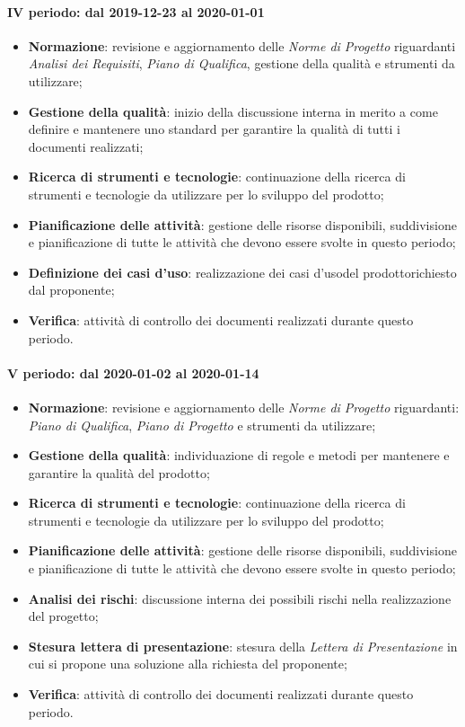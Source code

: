 \paragraph*{IV periodo: dal 2019-12-23 al 2020-01-01}
\begin{itemize}
	\item \textbf{Normazione}: revisione e aggiornamento delle \textit{Norme di Progetto} riguardanti \textit{Analisi dei Requisiti}, \textit{Piano di Qualifica}, gestione della qualità e strumenti da utilizzare;
	\item \textbf{Gestione della qualità}: inizio della discussione interna in merito a come definire e mantenere uno standard per garantire la qualità di tutti i documenti realizzati;
	\item \textbf{Ricerca di strumenti e tecnologie}: continuazione della ricerca di strumenti e tecnologie da utilizzare per lo sviluppo del prodotto\glo;
	\item \textbf{Pianificazione delle attività}: gestione delle risorse disponibili, suddivisione e pianificazione di tutte le attività che devono essere svolte in questo periodo;
	\item \textbf{Definizione dei casi d'uso}: realizzazione dei casi d'uso\glosp del prodotto\glosp richiesto dal proponente;
	\item \textbf{Verifica}: attività di controllo dei documenti realizzati durante questo periodo.
\end{itemize}


\paragraph*{V periodo: dal 2020-01-02 al 2020-01-14}
\begin{itemize}
	\item \textbf{Normazione}: revisione e aggiornamento delle \textit{Norme di Progetto} riguardanti: \textit{Piano di Qualifica}, \textit{Piano di Progetto} e strumenti da utilizzare;
	\item \textbf{Gestione della qualità}: individuazione di regole e metodi per mantenere e garantire la qualità del prodotto\glo;
	\item \textbf{Ricerca di strumenti e tecnologie}: continuazione della ricerca di strumenti e tecnologie da utilizzare per lo sviluppo del prodotto\glo;
	\item \textbf{Pianificazione delle attività}: gestione delle risorse disponibili, suddivisione e pianificazione di tutte le attività che devono essere svolte in questo periodo;
	\item \textbf{Analisi dei rischi}: discussione interna dei possibili rischi nella realizzazione del progetto\glo;
	\item \textbf{Stesura lettera di presentazione}: stesura della \textit{Lettera di Presentazione} in cui si propone una soluzione alla richiesta del proponente;
	\item \textbf{Verifica}: attività di controllo dei documenti realizzati durante questo periodo.
\end{itemize}

